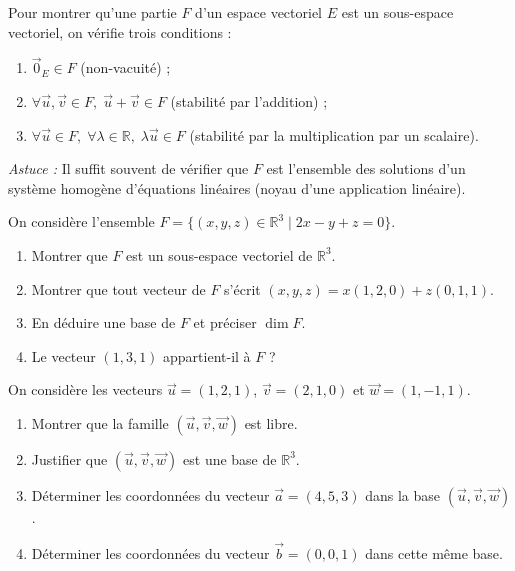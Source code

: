 \documentclass[11pt]{article}
\newcounter{popsec}
\newcounter{popsub}
\newcommand{\courssub}[1]{%
  \stepcounter{popsub}%
  \par\vspace{9pt}\noindent{\popxbold\fontsize{11.5}{13}\selectfont\color{popink}{\color{poporange}\thepopsec.\thepopsub}\hspace{6pt}#1}\par\nopagebreak\vspace{4pt}
}
\begin{document}
\courssub{Je m'entraîne}

\begin{methode}
Pour montrer qu'une partie $F$ d'un espace vectoriel $E$ est un sous-espace vectoriel, on vérifie trois conditions :
\begin{enumerate}
\item $\vec{0}_E \in F$ (non-vacuité) ;
\item $\forall \vec{u}, \vec{v} \in F,\; \vec{u} + \vec{v} \in F$ (stabilité par l'addition) ;
\item $\forall \vec{u} \in F,\; \forall \lambda \in \mathbb{R},\; \lambda \vec{u} \in F$ (stabilité par la multiplication par un scalaire).
\end{enumerate}
\emph{Astuce :} Il suffit souvent de vérifier que $F$ est l'ensemble des solutions d'un système homogène d'équations linéaires (noyau d'une application linéaire).
\end{methode}

\begin{exercice}
On considère l'ensemble $F = \{(x, y, z) \in \mathbb{R}^3 \mid 2x - y + z = 0\}$.
\begin{enumerate}
\item Montrer que $F$ est un sous-espace vectoriel de $\mathbb{R}^3$.
\item Montrer que tout vecteur de $F$ s'écrit $(x, y, z) = x(1, 2, 0) + z(0, 1, 1)$.
\item En déduire une base de $F$ et préciser $\dim F$.
\item Le vecteur $(1, 3, 1)$ appartient-il à $F$ ?
\end{enumerate}
\end{exercice}

\begin{exercice}
On considère les vecteurs $\vec{u} = (1, 2, 1)$, $\vec{v} = (2, 1, 0)$ et $\vec{w} = (1, -1, 1)$.
\begin{enumerate}
\item Montrer que la famille $(\vec{u}, \vec{v}, \vec{w})$ est libre.
\item Justifier que $(\vec{u}, \vec{v}, \vec{w})$ est une base de $\mathbb{R}^3$.
\item Déterminer les coordonnées du vecteur $\vec{a} = (4, 5, 3)$ dans la base $(\vec{u}, \vec{v}, \vec{w})$.
\item Déterminer les coordonnées du vecteur $\vec{b} = (0, 0, 1)$ dans cette même base.
\end{enumerate}
\end{exercice}
\end{document}
